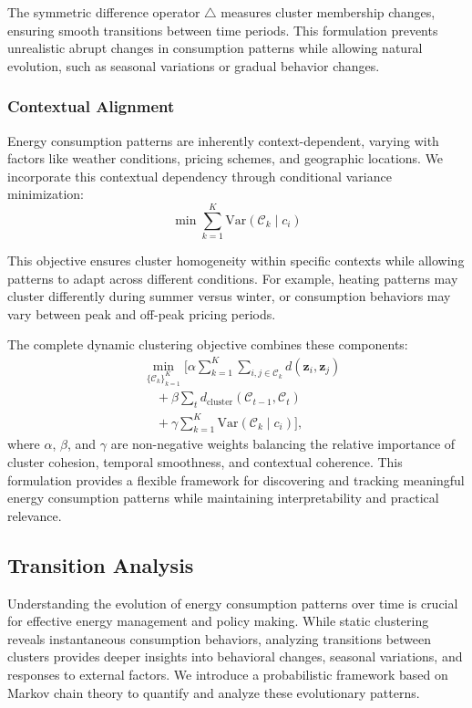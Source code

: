 \documentclass[final,5p,times,twocolumn,numbers]{elsarticle}
\begin{document}
The symmetric difference operator $\triangle$ measures cluster membership changes, ensuring smooth transitions between time periods. This formulation prevents unrealistic abrupt changes in consumption patterns while allowing natural evolution, such as seasonal variations or gradual behavior changes.

\subsubsection{Contextual Alignment}
Energy consumption patterns are inherently context-dependent, varying with factors like weather conditions, pricing schemes, and geographic locations. We incorporate this contextual dependency through conditional variance minimization:
\begin{equation}
    \min \sum_{k=1}^K \text{Var}(\mathcal{C}_k \mid c_i)
\end{equation}

This objective ensures cluster homogeneity within specific contexts while allowing patterns to adapt across different conditions. For example, heating patterns may cluster differently during summer versus winter, or consumption behaviors may vary between peak and off-peak pricing periods.

The complete dynamic clustering objective combines these components:
\begin{equation}
    \begin{aligned}
        & \min_{\{\mathcal{C}_k\}_{k=1}^K} \Bigg[ \alpha \sum_{k=1}^K \sum_{i,j \in \mathcal{C}_k} d(\mathbf{z}_i, \mathbf{z}_j) \\
        & \quad + \beta \sum_{t} d_{\text{cluster}}(\mathcal{C}_{t-1}, \mathcal{C}_t) \\
        & \quad + \gamma \sum_{k=1}^K \text{Var}(\mathcal{C}_k \mid c_i) \Bigg],
    \end{aligned}
\end{equation}
where $\alpha$, $\beta$, and $\gamma$ are non-negative weights balancing the relative importance of cluster cohesion, temporal smoothness, and contextual coherence. This formulation provides a flexible framework for discovering and tracking meaningful energy consumption patterns while maintaining interpretability and practical relevance.

\subsection{Transition Analysis}
Understanding the evolution of energy consumption patterns over time is crucial for effective energy management and policy making. While static clustering reveals instantaneous consumption behaviors, analyzing transitions between clusters provides deeper insights into behavioral changes, seasonal variations, and responses to external factors. We introduce a probabilistic framework based on Markov chain theory to quantify and analyze these evolutionary patterns.
\end{document}
